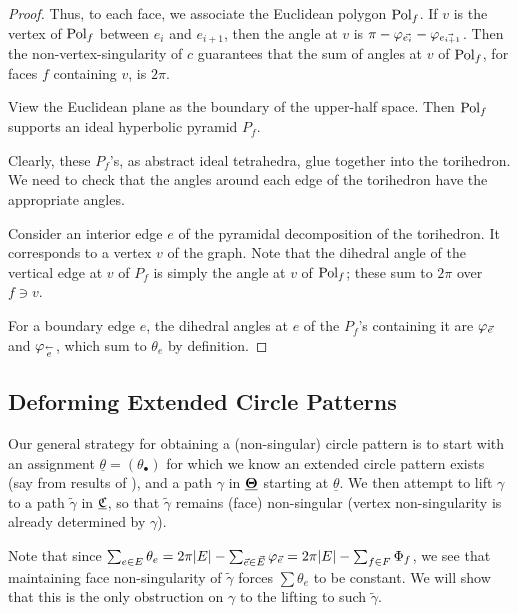 \begin{proof}
Thus, to each face, we associate the Euclidean polygon ${\text{Pol}}_f$.
If $v$ is the vertex of ${\text{Pol}}_f$ between $e_i$ and $e_{i+1}$,
then the angle at $v$ is
$\pi - \varphi_{\vec{e_i}} - \varphi_{\vec{e_{i+1}}}$.
Then the non-vertex-singularity of $c$ guarantees that
the sum of angles at $v$ of ${\text{Pol}}_f$, for faces $f$ containing $v$,
is $2\pi$.


View the Euclidean plane as the boundary of the upper-half space.
Then ${\text{Pol}}_f$ supports an ideal hyperbolic pyramid $P_f$.

Clearly, these $P_f$'s, as abstract ideal tetrahedra,
glue together into the torihedron.
We need to check that the angles around each edge of
the torihedron have the appropriate angles.


Consider an interior edge $e$ of the pyramidal decomposition
of the torihedron.
It corresponds to a vertex $v$ of the graph.
Note that the dihedral angle of the vertical edge
at $v$ of $P_f$ is simply the angle at $v$ of ${\text{Pol}}_f$;
these sum to $2\pi$ over $f \ni v$.


For a boundary edge $e$, the dihedral angles at $e$ of the $P_f$'s
containing it are $\varphi_{\vec{e}}$ and $\varphi_{\overset{\leftarrow}{e}}$,
which sum to $\theta_e$ by definition.

\end{proof}


\subsection{Deforming Extended Circle Patterns}



Our general strategy for obtaining a (non-singular) circle pattern
is to start with an assignment $\underline{\theta} = (\theta_\bullet)$
for which we know an extended circle pattern exists
(say from results of \cite{BandS}),
and a path $\gamma$ in ${\underline{\mathbf{\Theta}}}$ starting at $\underline{\theta}$.
We then attempt to lift $\gamma$ to a path $\tilde{\gamma}$ in ${\underline{\mathfrak{C}}}$,
so that $\tilde{\gamma}$ remains (face) non-singular
(vertex non-singularity is already determined by $\gamma$).

Note that since $\sum_{e\in E} \theta_e
= 2\pi |E| - \sum_{\vec{e} \in \vec{E}} \varphi_{\vec{e}}
= 2\pi |E| - \sum_{f\in F} \Phi_f$,
we see that maintaining face non-singularity of $\tilde{\gamma}$
forces $\sum \theta_e$ to be constant.
We will show that this is the only obstruction on $\gamma$
to the lifting to such $\tilde{\gamma}$.

